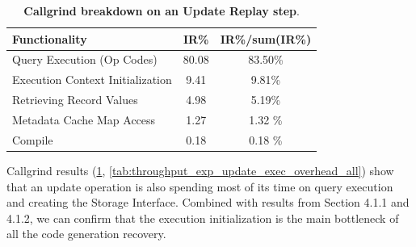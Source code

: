 \documentclass[12pt]{cmuthesis}
\begin{document}
\begin{table}[H]
\begin{center}
\begin{tabular}{ l c c } 
 \toprule
 \textbf{Functionality} & \textbf{IR\%} & \textbf{IR\%/sum(IR\%)} \\ 
 \toprule
Query Execution (Op Codes) & 80.08 & 83.50\% \\
 \midrule
 Execution Context Initialization & 9.41 & 9.81\% \\ 
 \midrule
 Retrieving Record Values & 4.98 & 5.19\% \\
 \midrule
 Metadata Cache Map Access & 1.27 & 1.32 \% \\
 \midrule
 Compile & 0.18 & 0.18 \% \\
 \bottomrule
\end{tabular}

\caption{\textbf{Callgrind breakdown on an Update Replay step}.}
\label{tab:throughput_exp_update_overhead_all}
\end{center}
\end{table}

\begin{table}[H]
\begin{center}
\caption{\textbf{Callgrind breakdown on the Query Execution step of an Update Replay step}.}
\label{tab:throughput_exp_update_exec_overhead_all}
\end{center}
\end{table}

Callgrind results (\cref{tab:throughput_exp_update_overhead_all}, \cref{tab:throughput_exp_update_exec_overhead_all}) show that an update operation is also spending most of its time on query execution and creating the Storage Interface. Combined with results from Section 4.1.1 and 4.1.2, we can confirm that the execution initialization is the main bottleneck of all the code generation recovery.
\end{document}
